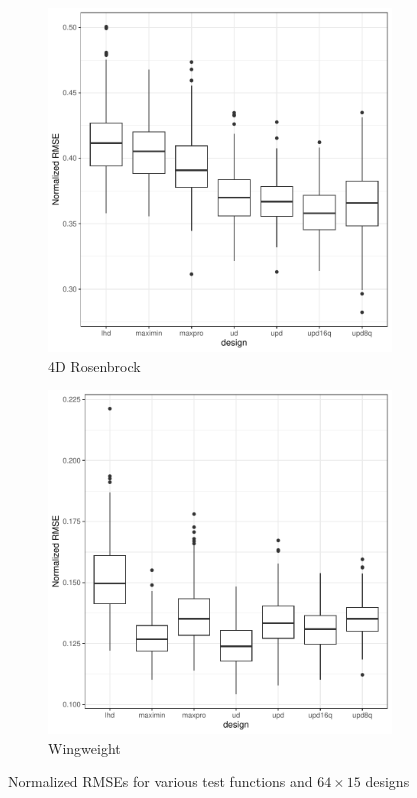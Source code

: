 \documentclass [PhD] {package/uclathes}
\begin{document}
\begin{figure}
\begin{adjustwidth}{-2cm}{-2cm}
\begin{subfigure}[b]{0.35\textwidth}
\end{subfigure}
\vfill
\begin{subfigure}[b]{0.35\textwidth}
\centering
\caption{4D Rosenbrock}
\includegraphics[width=\textwidth]{chapters/EGO/pdfs/Rosenbrock4d_64x15}
\end{subfigure}
\begin{subfigure}[b]{0.35\textwidth}
\centering
\caption{Wingweight}
\includegraphics[width=\textwidth]{chapters/EGO/pdfs/Wingweight_64x15}
\end{subfigure}
\caption{Normalized RMSEs for various test functions and $64\times 15$ designs}
\label{fig:boxplots_64x15}
\end{adjustwidth}
\end{figure}
\end{document}
